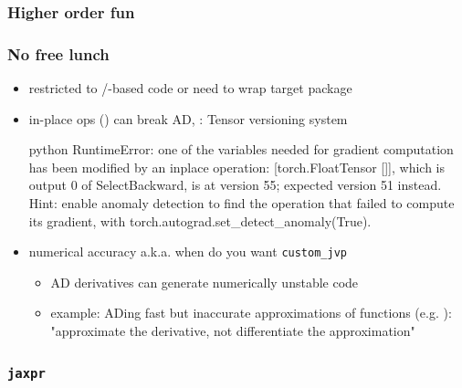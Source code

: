 \documentclass[fleqn,10pt]{beamer}
\begin{document}
\begin{frame}
    \frametitle{Higher order fun}
    \vspace{-0.3cm}
\end{frame}


\begin{frame}[fragile]
    \frametitle{No free lunch}
    \begin{itemize}
        \item restricted to \numpy/\pytorch-based code or need to wrap target package
        \item in-place ops () can break AD, \pytorch: Tensor versioning system
        \begin{mintedcode}{python}
    RuntimeError: one of the variables needed for gradient
    computation has been modified by an inplace operation:
    [torch.FloatTensor []], which is output 0 of
    SelectBackward, is at version 55; expected version 51
    instead. Hint: enable anomaly detection to find the
    operation that failed to compute its gradient, with
    torch.autograd.set_detect_anomaly(True).
        \end{mintedcode}
        \item numerical accuracy a.k.a. when do you want \verb|custom_jvp|
        \begin{itemize}
            \item AD derivatives can generate numerically unstable code
            \item example: ADing fast but inaccurate approximations of functions (e.g. ): "approximate the derivative, not differentiate
                the approximation"
        \end{itemize}
    \end{itemize}
\end{frame}


\begin{frame}
    \nocite{*}
    \printbibliography
\end{frame}

\begin{frame}
    \frametitle{\texttt{jaxpr}}
\end{frame}
\end{document}
